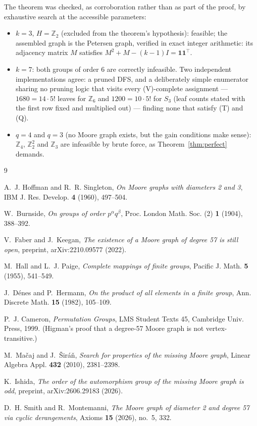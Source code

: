 \documentclass[10pt]{article}
\begin{document}
The theorem was checked, as corroboration rather than as part of the
proof, by exhaustive search at the accessible parameters:
\begin{itemize}
\item $k=3$, $H=\mathbb{Z}_2$ (excluded from the theorem's hypothesis):
feasible; the assembled graph is the Petersen graph, verified in exact
integer arithmetic: its adjacency matrix $M$ satisfies
$M^2+M-(k-1)I=\mathbf{1}\mathbf{1}^{\!\top}$.
\item $k=7$: both groups of order $6$ are correctly infeasible. Two
independent implementations agree: a pruned DFS, and a deliberately
simple enumerator sharing no pruning logic that visits every
(V)-complete assignment --- $1680=14\cdot 5!$ leaves for
$\mathbb{Z}_6$ and $1200=10\cdot 5!$ for $S_3$ (leaf counts stated
with the first row fixed and multiplied out) --- finding none that
satisfy (T) and (Q).
\item $q=4$ and $q=3$ (no Moore graph exists, but the gain conditions
make sense): $\mathbb{Z}_4$, $\mathbb{Z}_2^2$ and $\mathbb{Z}_3$ are
infeasible by brute force, as Theorem~\ref{thm:perfect} demands.
\end{itemize}

\begin{thebibliography}{9}

A.~J. Hoffman and R.~R. Singleton,
\emph{On Moore graphs with diameters 2 and 3},
IBM J. Res. Develop. \textbf{4} (1960), 497--504.

W.~Burnside,
\emph{On groups of order $p^\alpha q^\beta$},
Proc. London Math. Soc. (2) \textbf{1} (1904), 388--392.

V.~Faber and J.~Keegan,
\emph{The existence of a Moore graph of degree 57 is still open},
preprint, arXiv:2210.09577 (2022).

M.~Hall and L.~J. Paige,
\emph{Complete mappings of finite groups},
Pacific J. Math. \textbf{5} (1955), 541--549.

J.~Dénes and P.~Hermann,
\emph{On the product of all elements in a finite group},
Ann. Discrete Math. \textbf{15} (1982), 105--109.

P.~J. Cameron,
\emph{Permutation Groups},
LMS Student Texts 45, Cambridge Univ. Press, 1999.
(Higman's proof that a degree-57 Moore graph is not vertex-transitive.)

M.~Mačaj and J.~Širáň,
\emph{Search for properties of the missing Moore graph},
Linear Algebra Appl. \textbf{432} (2010), 2381--2398.

K.~Ishida,
\emph{The order of the automorphism group of the missing Moore graph is odd},
preprint, arXiv:2606.29183 (2026).

D.~H. Smith and R.~Montemanni,
\emph{The Moore graph of diameter 2 and degree 57 via cyclic derangements},
Axioms \textbf{15} (2026), no.~5, 332.

\end{thebibliography}
\end{document}
